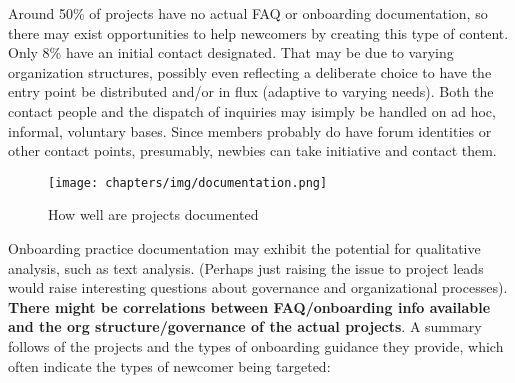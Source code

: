 Around 50\% of projects have no actual FAQ or onboarding documentation, so there may exist opportunities to help newcomers by creating this type of content. Only 8\% have an initial contact designated. That may be due to varying organization structures, possibly even reflecting a deliberate choice to have the entry point be distributed and/or in flux (adaptive to varying needs). Both the contact people and the dispatch of inquiries may isimply be handled on ad hoc, informal, voluntary bases. Since members probably do have forum identities or other contact points, presumably, newbies can take initiative and contact them.

\begin{figure}[ht!]
\centering
\texttt{[image: chapters/img/documentation.png]}
\caption{How well are projects documented }
\label{overflow}
\end{figure}

Onboarding practice documentation may exhibit the potential for qualitative analysis, such as text analysis. (Perhaps just raising the issue  to project leads would raise interesting questions about governance and organizational processes). {\bf There might be correlations between FAQ/onboarding info available and the org structure/governance of the actual projects}. A summary follows of the projects and the types of onboarding guidance they provide, which often indicate the types of newcomer being targeted:

